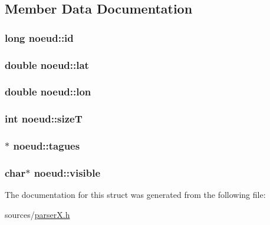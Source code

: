 \subsection{Member Data Documentation}
\hypertarget{structnoeud_a222a85d52e80824f5f75e54ca0f65ce8}{
\subsubsection[{id}]{\setlength{\rightskip}{0pt plus 5cm}long noeud\-::id}}\label{structnoeud_a222a85d52e80824f5f75e54ca0f65ce8}
\hypertarget{structnoeud_a3ae810fe8716673860124a82ed3095d3}{
\subsubsection[{lat}]{\setlength{\rightskip}{0pt plus 5cm}double noeud\-::lat}}\label{structnoeud_a3ae810fe8716673860124a82ed3095d3}
\hypertarget{structnoeud_a6815797ced511a355ce268e226d1f1f4}{
\subsubsection[{lon}]{\setlength{\rightskip}{0pt plus 5cm}double noeud\-::lon}}\label{structnoeud_a6815797ced511a355ce268e226d1f1f4}
\hypertarget{structnoeud_acd28afd8fa9ed63b4dd844268dd25817}{
\subsubsection[{size\-T}]{\setlength{\rightskip}{0pt plus 5cm}int noeud\-::size\-T}}\label{structnoeud_acd28afd8fa9ed63b4dd844268dd25817}
\hypertarget{structnoeud_af58bb6ad2885cb12e17cdc8cc0543358}{
\subsubsection[{tagues}]{$\ast$ noeud\-::tagues}}\label{structnoeud_af58bb6ad2885cb12e17cdc8cc0543358}
\hypertarget{structnoeud_aed8c867c16325b8f8f48e13ab2668ddd}{
\subsubsection[{visible}]{\setlength{\rightskip}{0pt plus 5cm}char$\ast$ noeud\-::visible}}\label{structnoeud_aed8c867c16325b8f8f48e13ab2668ddd}


The documentation for this struct was generated from the following file\-:\begin{DoxyCompactItemize}
\item 
sources/\hyperlink{parser_x_8h}{parser\-X.\-h}\end{DoxyCompactItemize}
